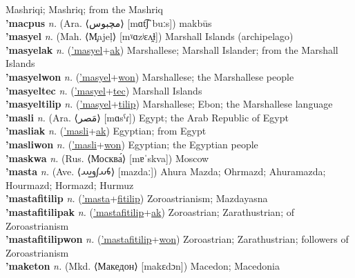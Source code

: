 Mashriqi; Mashriq; from the Mashriq \label{'maclekak} \\
\textbf{'macpus} \textit{n.} (Ara. ⟨مچبوس⟩ [mɑt͡ʃˈbuːs])
makbūs \label{'macpus} \\
\textbf{'masyel} \textit{n.} (Mah. ⟨M̧ajeļ⟩ [mˠɑzʲɛʌ̯ɫ])
Marshall Islands (archipelago) \label{'masyel} \\
\textbf{'masyelak} \textit{n.} (\hyperref['masyel]{'masyel}+\hyperref[ak]{ak})
Marshallese; Marshall Islander; from the Marshall Islands \label{'masyelak} \\
\textbf{'masyelwon} \textit{n.} (\hyperref['masyel]{'masyel}+\hyperref[won]{won})
Marshallese; the Marshallese people \label{'masyelwon} \\
\textbf{'masyeltec} \textit{n.} (\hyperref['masyel]{'masyel}+\hyperref[tec]{tec})
Marshall Islands \label{'masyeltec} \\
\textbf{'masyeltilip} \textit{n.} (\hyperref['masyel]{'masyel}+\hyperref[tilip]{tilip})
Marshallese; Ebon; the Marshallese language \label{'masyeltilip} \\
\textbf{'masli} \textit{n.} (Ara. ⟨مَصر⟩ [mɑsˁɾ])
Egypt; the Arab Republic of Egypt \label{'masli} \\
\textbf{'masliak} \textit{n.} (\hyperref['masli]{'masli}+\hyperref[ak]{ak})
Egyptian; from Egypt \label{'masliak} \\
\textbf{'masliwon} \textit{n.} (\hyperref['masli]{'masli}+\hyperref[won]{won})
Egyptian; the Egyptian people \label{'masliwon} \\
\textbf{'maskwa} \textit{n.} (Rus. ⟨Москва́⟩ [mɐˈskva])
Moscow \label{'maskwa} \\
\textbf{'masta} \textit{n.} (Ave. ⟨𐬨𐬀𐬰𐬛𐬁⟩ [mazdaː])
Ahura Mazda; Ohrmazd; Ahuramazda; Hourmazd; Hormazd; Hurmuz \label{'masta} \\
\textbf{'mastafitilip} \textit{n.} (\hyperref['masta]{'masta}+\hyperref[fitilip]{fitilip})
Zoroastrianism; Mazdayasna \label{'mastafitilip} \\
\textbf{'mastafitilipak} \textit{n.} (\hyperref['mastafitilip]{'mastafitilip}+\hyperref[ak]{ak})
Zoroastrian; Zarathustrian; of Zoroastrianism \label{'mastafitilipak} \\
\textbf{'mastafitilipwon} \textit{n.} (\hyperref['mastafitilip]{'mastafitilip}+\hyperref[won]{won})
Zoroastrian; Zarathustrian; followers of Zoroastrianism \label{'mastafitilipwon} \\
\textbf{'maketon} \textit{n.} (Mkd. ⟨Македон⟩ [makɛdɔn])
Macedon; Macedonia \label{'maketon} \\
